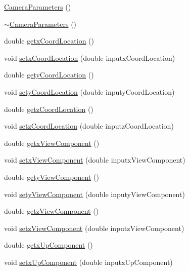 \begin{DoxyCompactItemize}
\item 
\hyperlink{classCameraParameters_adf73697f1136028ab13ecf8a0b878f22}{Camera\-Parameters} ()
\item 
\hyperlink{classCameraParameters_a3aee3e9df9a0cd6c5a8e92eccc0fe99e}{$\sim$\-Camera\-Parameters} ()
\item 
double \hyperlink{classCameraParameters_a10dbf4916580a9f49c80405f0c18661a}{getx\-Coord\-Location} ()
\item 
void \hyperlink{classCameraParameters_a3add6963fbe82801c07f084b995bae43}{setx\-Coord\-Location} (double inputx\-Coord\-Location)
\item 
double \hyperlink{classCameraParameters_a83637f8bac44708de0f83cec5bb3b5a2}{gety\-Coord\-Location} ()
\item 
void \hyperlink{classCameraParameters_a716cc61f61926abe4fdf9cb9077d43b6}{sety\-Coord\-Location} (double inputy\-Coord\-Location)
\item 
double \hyperlink{classCameraParameters_aee0d9295e7460628338786214516b05c}{getz\-Coord\-Location} ()
\item 
void \hyperlink{classCameraParameters_acf7bbd099df290e249684592dccdc8a8}{setz\-Coord\-Location} (double inputz\-Coord\-Location)
\item 
double \hyperlink{classCameraParameters_a475c79d960a1188b0e9872445de9676e}{getx\-View\-Component} ()
\item 
void \hyperlink{classCameraParameters_a90cd361f13faa64df05ab35c0dd945c9}{setx\-View\-Component} (double inputx\-View\-Component)
\item 
double \hyperlink{classCameraParameters_a17ad996296c517785a7e7c3cc248009b}{gety\-View\-Component} ()
\item 
void \hyperlink{classCameraParameters_a89c231c89636cd890d76f9fadf892b86}{sety\-View\-Component} (double inputy\-View\-Component)
\item 
double \hyperlink{classCameraParameters_a8dbfc56269e0aa1ef0580041a82e35d2}{getz\-View\-Component} ()
\item 
void \hyperlink{classCameraParameters_a88affa41cddf751b7e7f7b21ab86e3b6}{setz\-View\-Component} (double inputz\-View\-Component)
\item 
double \hyperlink{classCameraParameters_ad82437a6c306727df94d52d745fe67b6}{getx\-Up\-Component} ()
\item 
void \hyperlink{classCameraParameters_a84be8b9d5fe9e3dabd76db7c03fd66b9}{setx\-Up\-Component} (double inputx\-Up\-Component)

\end{DoxyCompactItemize}
